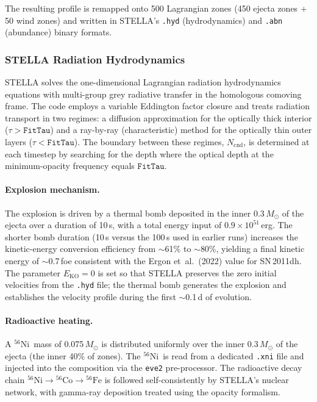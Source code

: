 \documentclass[11pt, a4paper]{article}
\newcommand{\Msun}{\ensuremath{M_\odot}}
\newcommand{\Ncnd}{\ensuremath{N_{\mathrm{cnd}}}}
\newcommand{\FitTau}{\ensuremath{\mathtt{FitTau}}}
\newcommand{\EKO}{\ensuremath{E_{\mathrm{KO}}}}
\newcommand{\Ni}{\ensuremath{^{56}\mathrm{Ni}}}
\newcommand{\Co}{\ensuremath{^{56}\mathrm{Co}}}
\newcommand{\Fe}{\ensuremath{^{56}\mathrm{Fe}}}
\begin{document}
The resulting profile is remapped onto 500 Lagrangian zones (450 ejecta
zones + 50 wind zones) and written in STELLA's \texttt{.hyd} (hydrodynamics)
and \texttt{.abn} (abundance) binary formats.

\subsubsection{STELLA Radiation Hydrodynamics}
\label{subsubsec:stella_sn_a}

STELLA \citep{Blinnikov1998, Blinnikov2000, Blinnikov2006} solves the
one-dimensional Lagrangian radiation hydrodynamics equations with
multi-group grey radiative transfer in the homologous comoving frame.  The
code employs a variable Eddington factor closure and treats radiation
transport in two regimes: a diffusion approximation for the optically
thick interior ($\tau > \FitTau$) and a ray-by-ray (characteristic) method
for the optically thin outer layers ($\tau < \FitTau$).  The boundary
between these regimes, $\Ncnd$, is determined at each timestep by searching
for the depth where the optical depth at the minimum-opacity frequency
equals $\FitTau$.

\paragraph{Explosion mechanism.}
The explosion is driven by a thermal bomb deposited in the inner
0.3\,$\Msun$ of the ejecta over a duration of 10\,s, with a total energy
input of $0.9 \times 10^{51}$\,erg.  The shorter bomb duration (10\,s
versus the 100\,s used in earlier runs) increases the kinetic-energy
conversion efficiency from $\sim$61\% to $\sim$80\%, yielding a final
kinetic energy of $\sim$0.7\,foe consistent with the Ergon et~al.\ (2022)
value for SN\,2011dh.  The parameter $\EKO = 0$ is set so that STELLA
preserves the zero initial velocities from the \texttt{.hyd} file; the
thermal bomb generates the explosion and establishes the velocity profile
during the first $\sim$0.1\,d of evolution.

\paragraph{Radioactive heating.}
A \Ni\ mass of 0.075\,$\Msun$ \citep{Ergon2022} is distributed uniformly
over the inner 0.3\,$\Msun$ of the ejecta (the inner 40\% of zones).  The
\Ni\ is read from a dedicated \texttt{.xni} file and injected into the
composition via the \texttt{eve2} pre-processor.  The radioactive decay
chain $\Ni \to \Co \to \Fe$ is followed self-consistently by STELLA's
nuclear network, with gamma-ray deposition treated using the
\citet{Swartz1995} opacity formalism.
\end{document}
